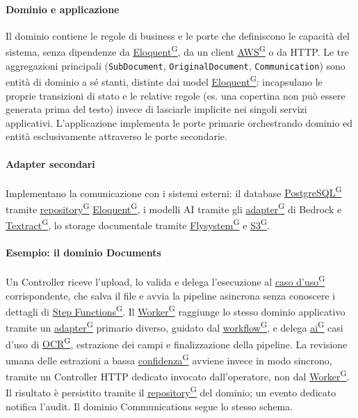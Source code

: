 \documentclass[a4paper,12pt]{article}
\providecommand{\glslink}[2]{\href{https://alittlebyte-19.github.io/Documentazione/glossario.html\#gls-#1}{\underline{#2}\textsuperscript{\scriptsize G}}}
\begin{document}
\paragraph{Dominio e applicazione}
Il dominio contiene le regole di business e le porte che definiscono le capacità del sistema, senza dipendenze da \glslink{eloquent}{Eloquent}, da un client \glslink{aws}{AWS} o da HTTP. Le tre aggregazioni principali (\texttt{SubDocument}, \texttt{OriginalDocument}, \texttt{Communication}) sono entità di dominio a sé stanti, distinte dai model \glslink{eloquent}{Eloquent}: incapsulano le proprie transizioni di stato e le relative regole (es. una copertina non può essere generata prima del testo) invece di lasciarle implicite nei singoli servizi applicativi. L'applicazione implementa le porte primarie orchestrando dominio ed entità esclusivamente attraverso le porte secondarie.

\paragraph{Adapter secondari}
Implementano la comunicazione con i sistemi esterni: il database \glslink{postgresql}{PostgreSQL} tramite \glslink{repository}{repository} \glslink{eloquent}{Eloquent}, i modelli AI tramite gli \glslink{adapter}{adapter} di Bedrock e \glslink{textract}{Textract}, lo storage documentale tramite \glslink{flysystem}{Flysystem} e \glslink{s3-simple-storage-service}{S3}.

\paragraph{Esempio: il dominio Documents}
Un Controller riceve l'upload, lo valida e delega l'esecuzione al \glslink{caso-d-uso-uc}{caso d'uso} corrispondente, che salva il file e avvia la pipeline asincrona senza conoscere i dettagli di \glslink{step-functions}{Step Functions}. Il \glslink{worker}{Worker} raggiunge lo stesso dominio applicativo tramite un \glslink{adapter}{adapter} primario diverso, guidato dal \glslink{workflow}{workflow}, e delega \glslink{intelligenza-artificiale-ai}{ai} casi d'uso di \glslink{ocr-riconoscimento-ottico-dei-caratteri}{OCR}, estrazione dei campi e finalizzazione della pipeline. La revisione umana delle estrazioni a bassa \glslink{confidenza-confidence-score}{confidenza} avviene invece in modo sincrono, tramite un Controller HTTP dedicato invocato dall'operatore, non dal \glslink{worker}{Worker}. Il risultato è persistito tramite il \glslink{repository}{repository} del dominio; un evento dedicato notifica l'audit. Il dominio Communications segue lo stesso schema.
\end{document}

